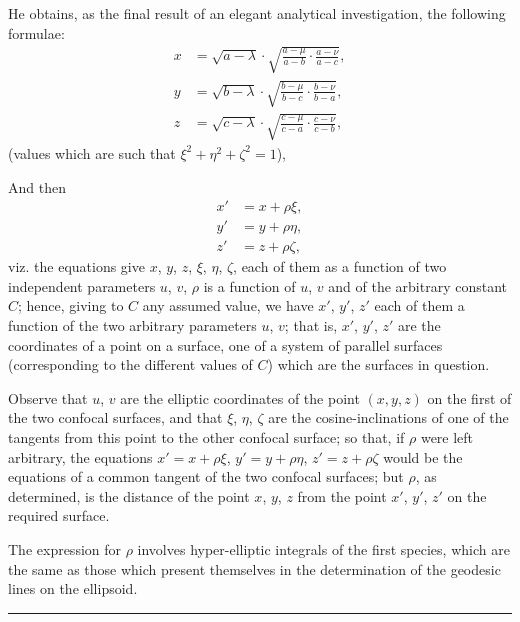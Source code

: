 \documentclass[11pt,a4paper]{book}
\begin{document}
He obtains, as the final result of an elegant analytical investigation, the following formulae:
\begin{align*}
x &= \sqrt{a - \lambda} \cdot \sqrt{\frac{a - \mu}{a - b} \cdot \frac{a - \nu}{a - c}}, \\
y &= \sqrt{b - \lambda} \cdot \sqrt{\frac{b - \mu}{b - c} \cdot \frac{b - \nu}{b - a}}, \\
z &= \sqrt{c - \lambda} \cdot \sqrt{\frac{c - \mu}{c - a} \cdot \frac{c - \nu}{c - b}},
\end{align*}
(values which are such that $\xi^2 + \eta^2 + \zeta^2 = 1$),

And then
\begin{align*}
x' &= x + \rho\xi, \\
y' &= y + \rho\eta, \\
z' &= z + \rho\zeta,
\end{align*}
viz. the equations give $x$, $y$, $z$, $\xi$, $\eta$, $\zeta$, each of them as a function of two independent parameters $u$, $v$, $\rho$ is a function of $u$, $v$ and of the arbitrary constant $C$; hence, giving to $C$ any assumed value, we have $x'$, $y'$, $z'$ each of them a function of the two arbitrary parameters $u$, $v$; that is, $x'$, $y'$, $z'$ are the coordinates of a point on a surface, one of a system of parallel surfaces (corresponding to the different values of $C$) which are the surfaces in question.

Observe that $u$, $v$ are the elliptic coordinates of the point $(x, y, z)$ on the first of the two confocal surfaces, and that $\xi$, $\eta$, $\zeta$ are the cosine-inclinations of one of the tangents from this point to the other confocal surface; so that, if $\rho$ were left arbitrary, the equations $x' = x + \rho\xi$, $y' = y + \rho\eta$, $z' = z + \rho\zeta$ would be the equations of a common tangent of the two confocal surfaces; but $\rho$, as determined, is the distance of the point $x$, $y$, $z$ from the point $x'$, $y'$, $z'$ on the required surface.

The expression for $\rho$ involves hyper-elliptic integrals of the first species, which are the same as those which present themselves in the determination of the geodesic lines on the ellipsoid.

\vspace{12pt}
\hrule
\vspace{12pt}

\end{document}
